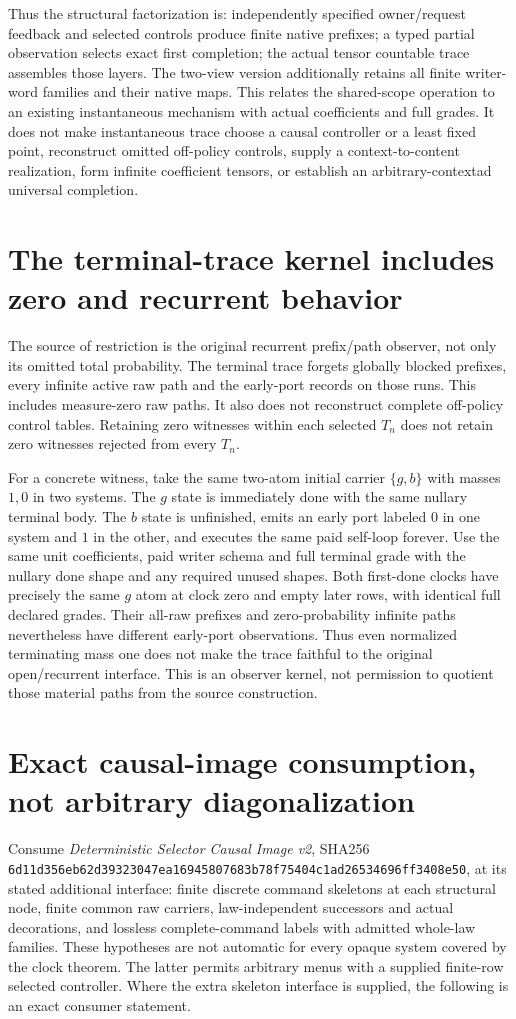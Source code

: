 \documentclass[11pt]{article}\usepackage{amsmath,amssymb,amsthm,geometry}\geometry{margin=1in}\newtheorem{definition}{Definition}\newtheorem{theorem}[definition]{Theorem}\newtheorem{proposition}[definition]{Proposition}
\begin{document}
Thus the structural factorization is: independently specified owner/request feedback and selected controls produce finite native prefixes; a typed partial observation selects exact first completion; the actual tensor countable trace assembles those layers. The two-view version additionally retains all finite writer-word families and their native maps. This relates the shared-scope operation to an existing instantaneous mechanism with actual coefficients and full grades. It does not make instantaneous trace choose a causal controller or a least fixed point, reconstruct omitted off-policy controls, supply a context-to-content realization, form infinite coefficient tensors, or establish an arbitrary-contextad universal completion.

\section{The terminal-trace kernel includes zero and recurrent behavior}
The source of restriction is the original recurrent prefix/path observer, not only its omitted total probability. The terminal trace forgets globally blocked prefixes, every infinite active raw path and the early-port records on those runs. This includes measure-zero raw paths. It also does not reconstruct complete off-policy control tables. Retaining zero witnesses within each selected $T_n$ does not retain zero witnesses rejected from every $T_n$.

For a concrete witness, take the same two-atom initial carrier $\{g,b\}$ with masses $1,0$ in two systems. The $g$ state is immediately done with the same nullary terminal body. The $b$ state is unfinished, emits an early port labeled $0$ in one system and $1$ in the other, and executes the same paid self-loop forever. Use the same unit coefficients, paid writer schema and full terminal grade with the nullary done shape and any required unused shapes. Both first-done clocks have precisely the same $g$ atom at clock zero and empty later rows, with identical full declared grades. Their all-raw prefixes and zero-probability infinite paths nevertheless have different early-port observations. Thus even normalized terminating mass one does not make the trace faithful to the original open/recurrent interface. This is an observer kernel, not permission to quotient those material paths from the source construction.


\section{Exact causal-image consumption, not arbitrary diagonalization}
Consume \emph{Deterministic Selector Causal Image v2}, SHA256
\texttt{6d11d356eb62d39323047ea16945807683b78f75404c1ad26534696ff3408e50}, at its stated additional interface: finite discrete command skeletons at each structural node, finite common raw carriers, law-independent successors and actual decorations, and lossless complete-command labels with admitted whole-law families. These hypotheses are not automatic for every opaque system covered by the clock theorem. The latter permits arbitrary menus with a supplied finite-row selected controller. Where the extra skeleton interface is supplied, the following is an exact consumer statement.
\end{document}

